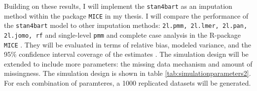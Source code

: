 \documentclass[10pt, a4paper, titlepage]{article}
\begin{document}
Building on these results, I will implement the \texttt{stan4bart} as an imputation method within the package \texttt{MICE} \citep{buuren2011} in my thesis. I will compare the performance of the \texttt{stan4bart} model to other imputation methods: \texttt{2l.pmm, 2l.lmer, 2l.pan, 2l.jomo, rf} and single-level \texttt{pmm} and complete case analysis in the R-package \texttt{MICE} \citep{buuren2011}. They will be evaluated in terms of relative bias, modeled variance, and the 95\% confidence interval coverage of the estimates \citep{oberman2023}. The simulation design will be extended to include more parameters: the missing data mechanism and amount of missingness. The simulation design is shown in table \ref{tab:simulationparameters2}. For each combination of paramteres, a 1000 replicated datasets will be generated.

\newpage


\end{document}
